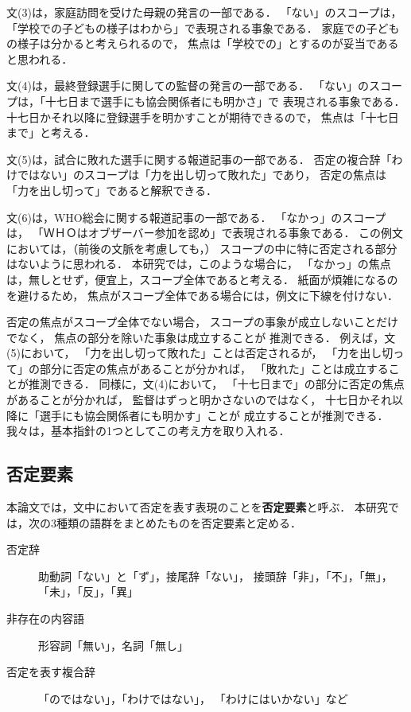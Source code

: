 \documentclass[japanese]{jnlp_1.4}
\begin{document}
文(3)は，家庭訪問を受けた母親の発言の一部である．
「ない」のスコープは，「学校での子どもの様子はわから」で表現される事象である．
家庭での子どもの様子は分かると考えられるので，
焦点は「学校での」とするのが妥当であると思われる．

文(4)は，最終登録選手に関しての監督の発言の一部である．
「ない」のスコープは，「十七日まで選手にも協会関係者にも明かさ」で
表現される事象である．
十七日かそれ以降に登録選手を明かすことが期待できるので，
焦点は「十七日まで」と考える．

文(5)は，試合に敗れた選手に関する報道記事の一部である．
否定の複合辞「わけではない」のスコープは「力を出し切って敗れた」であり，
否定の焦点は「力を出し切って」であると解釈できる．

文(6)は，WHO総会に関する報道記事の一部である．
「なかっ」のスコープは，
「ＷＨＯはオブザーバー参加を認め」で表現される事象である．
この例文においては，（前後の文脈を考慮しても，）
スコープの中に特に否定される部分はないように思われる．
本研究では，このような場合に，
「なかっ」の焦点は，無しとせず，便宜上，スコープ全体であると考える．
紙面が煩雑になるのを避けるため，
焦点がスコープ全体である場合には，例文に下線を付けない．

否定の焦点がスコープ全体でない場合，
スコープの事象が成立しないことだけでなく，
焦点の部分を除いた事象は成立することが
推測できる\cite{neg2007,EduardoMoldo2011b}．
例えば，文(5)において，
「力を出し切って敗れた」ことは否定されるが，
「力を出し切って」の部分に否定の焦点があることが分かれば，
「敗れた」ことは成立することが推測できる．
同様に，文(4)において，
「十七日まで」の部分に否定の焦点があることが分かれば，
監督はずっと明かさないのではなく，
十七日かそれ以降に「選手にも協会関係者にも明かす」ことが
成立することが推測できる．
我々は，基本指針の1つとしてこの考え方を取り入れる．


\subsection{否定要素}
\label{subsec:neg}

本論文では，文中において否定を表す表現のことを\textbf{否定要素}と呼ぶ．
本研究では，次の3種類の語群をまとめたものを否定要素と定める．
\begin{description}
\item[否定辞] 助動詞「ない」と「ず」，接尾辞「ない」，
  接頭辞「非」，「不」，「無」，「未」，「反」，「異」
\item[非存在の内容語] 形容詞「無い」，名詞「無し」
\item[否定を表す複合辞] 「のではない」，「わけではない」，
  「わけにはいかない」など
\end{description}
\end{document}
